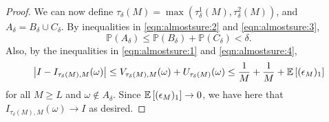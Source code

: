 \begin{proof}
        We can now define $\tau_\delta(M) = \max(\tau^1_\delta(M), \tau^2_\delta(M))$, and 
        $A_\delta = B_\delta \cup C_\delta$. By inequalities in \eqref{eqn:almostsure:2}
        and \eqref{eqn:almostsure:3},
        \[ 
                \mathbb{P}(A_\delta) \leq \mathbb{P}(B_\delta) + \mathbb{P}(C_\delta) < \delta.  
        \] 
        Also, by the inequalities in \eqref{eqn:almostsure:1} and \eqref{eqn:almostsure:4},
	\[ 
                \left|I - I_{\tau_\delta(M),M}(\omega)\right| 
                \leq
                V_{\tau_\delta(M),M}(\omega) 
                +
                U_{\tau_\delta(M)}(\omega) 
                \leq 
                \frac{1}{M} + \frac{1}{M} + \mathbb{E}\left[(\epsilon_M)_1\right]
	\]
        for all $M \geq L$ and $\omega \notin A_\delta$. Since $\mathbb{E}\left[(\epsilon_M)_1\right] \to 0$, we have here that 
        $I_{\tau_\delta(M),M}(\omega) \to I$ as desired.
\end{proof}
